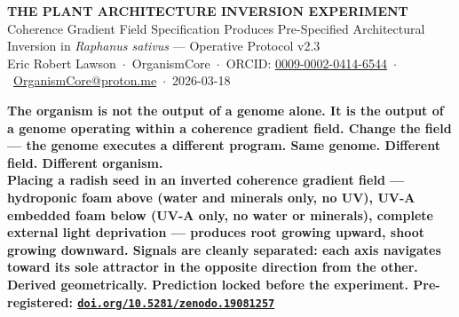 \documentclass[8pt, a4paper]{article}
\begin{document}
\begin{center}
  {\large\bfseries\color{headergreen}
  THE PLANT ARCHITECTURE INVERSION EXPERIMENT}\\[0.03em]
  {\small\color{headergreen}
  Coherence Gradient Field Specification Produces
  Pre-Specified Architectural Inversion
  in \textit{Raphanus sativus} --- Operative Protocol v2.3}\\[0.03em]
  {\footnotesize
  Eric Robert Lawson\ $\cdot$\
  OrganismCore\ $\cdot$\
  ORCID: \href{https://orcid.org/0009-0002-0414-6544}{0009-0002-0414-6544}\ $\cdot$\
  \href{mailto:OrganismCore@proton.me}{OrganismCore@proton.me}\ $\cdot$\
  2026-03-18}
\end{center}

\vspace{0.03em}

\begin{mdframed}[
  backgroundcolor=statementbox, linecolor=statementbox,
  linewidth=0pt,
  innertopmargin=0.2em, innerbottommargin=0.2em,
  innerleftmargin=0.6em, innerrightmargin=0.6em
]
\begin{center}
\footnotesize\bfseries\color{white}
The organism is not the output of a genome alone.
It is the output of a genome operating within a coherence gradient field.
Change the field --- the genome executes a different program.
Same genome. Different field. Different organism.\\
Placing a radish seed in an \textbf{inverted coherence gradient field}
--- hydroponic foam above (water and minerals only, no UV),
UV-A embedded foam below (UV-A only, no water or minerals),
complete external light deprivation ---
produces \textbf{root growing upward, shoot growing downward.}
Signals are cleanly separated: each axis navigates toward
its sole attractor in the opposite direction from the other.
Derived geometrically. \textbf{Prediction locked before the experiment.}
Pre-registered:
\href{https://doi.org/10.5281/zenodo.19081257}{\texttt{doi.org/10.5281/zenodo.19081257}}
\end{center}
\end{mdframed}

\vspace{0.1em}
\end{document}
